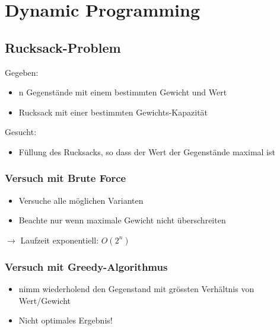 \section{Dynamic Programming}

\subsection{Rucksack-Problem}
Gegeben:
\begin{itemize}
    \item n Gegenstände mit einem bestimmten Gewicht und Wert
    \item Rucksack mit einer bestimmten Gewichts-Kapazität
\end{itemize}
Gesucht:
\begin{itemize}
    \item Füllung des Rucksacks, so dass der Wert der Gegenstände maximal ist
\end{itemize}

\subsubsection{Versuch mit Brute Force}
\begin{itemize}
    \item Versuche alle möglichen Varianten
    \item Beachte nur wenn maximale Gewicht nicht überschreiten
\end{itemize}
$\rightarrow$ Laufzeit exponentiell: $O(2^n)$

\subsubsection{Versuch mit Greedy-Algorithmus}
\begin{itemize}
    \item nimm wiederholend den Gegenstand mit grössten Verhältnis von Wert/Gewicht
    \item Nicht optimales Ergebnis!
\end{itemize}
